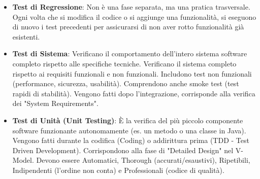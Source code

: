\documentclass[11pt,a4paper]{article}
\begin{document}
\begin{itemize}
\item \textbf{Test di Regressione}: Non è una fase separata, ma una pratica trasversale. Ogni volta che si modifica il codice o si aggiunge una funzionalità, si eseguono di nuovo i test precedenti per assicurarsi di non aver rotto funzionalità già esistenti.

\item \textbf{Test di Sistema}: Verificano il comportamento dell'intero sistema software completo rispetto alle specifiche tecniche. Verificano il sistema completo rispetto ai requisiti funzionali e non funzionali. Includono test non funzionali (performance, sicurezza, usabilità). Comprendono anche smoke test (test rapidi di stabilità). Vengono fatti dopo l'integrazione, corrisponde alla verifica dei "System Requirements".

\item \textbf{Test di Unità (Unit Testing)}: È la verifica del più piccolo componente software funzionante autonomamente (es. un metodo o una classe in Java). Vengono fatti durante la codifica (Coding) o addirittura prima (TDD - Test Driven Development). Corrispondono alla fase di "Detailed Design" nel V-Model. Devono essere Automatici, Thorough (accurati/esaustivi), Ripetibili, Indipendenti (l'ordine non conta) e Professionali (codice di qualità).

\end{itemize}

\newpage
\end{document}

